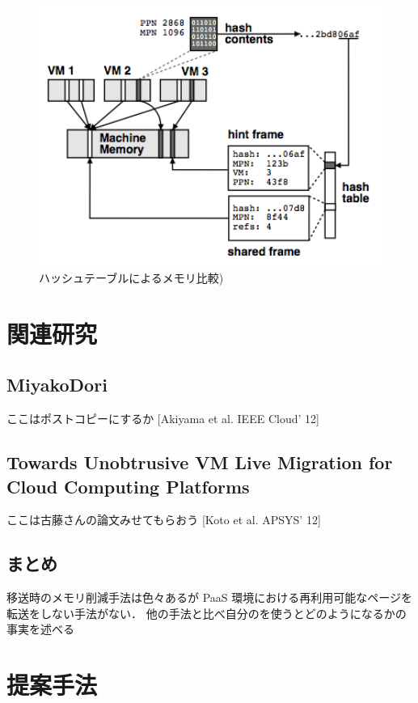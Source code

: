 \documentclass[graduation-thesis]{mlarticle}
\begin{document}
\begin{figure}[H]\begin{center}\includegraphics[width=16.0cm]{./img/hashtable.png}\caption{ ハッシュテーブルによるメモリ比較)}\label{hashtable}\end{center}\end{figure}

\clearpage
\section{関連研究}
\label{sec-3}
\subsection{MiyakoDori}
\label{sec-3-1}
ここはポストコピーにするか
[Akiyama et al. IEEE Cloud’ 12]
\subsection{Towards Unobtrusive VM Live Migration for Cloud Computing Platforms}
\label{sec-3-2}
ここは古藤さんの論文みせてもらおう
[Koto et al.  APSYS’ 12]
\subsection{まとめ}
\label{sec-3-3}
移送時のメモリ削減手法は色々あるが PaaS 環境における再利用可能なページを転送をしない手法がない．
他の手法と比べ自分のを使うとどのようになるかの事実を述べる

\clearpage
\section{提案手法}
\label{sec-4}
\end{document}
